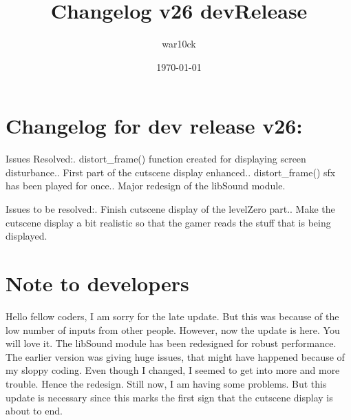 \documentclass[a4paper]{article}
\begin{document}
\title{Changelog v26 devRelease}	%
\author{war10ck}	%
\date{\today}
\maketitle

\section{Changelog for dev release v26:}
Issues Resolved:. distort\_frame() function created for displaying screen disturbance.. First part of the cutscene display enhanced.. distort\_frame() sfx has been played for once.. Major redesign of the libSound module.\newline

Issues to be resolved:. Finish cutscene display of the levelZero part.. Make the cutscene display a bit realistic so that the gamer reads the stuff that is being displayed.\newline

\section{Note to developers}
Hello fellow coders, I am sorry for the late update. But this was because of the low number of inputs from other people. However, now the update is here. You will love it. The libSound module has been redesigned for robust performance. The earlier version was giving huge issues, that might have happened because of my sloppy coding. Even though I changed, I seemed to get into more and more trouble. Hence the redesign. Still now, I am having some problems. But this update is necessary since this marks the first sign that the cutscene display is about to end.\newline

\pagebreak
\end{document}
